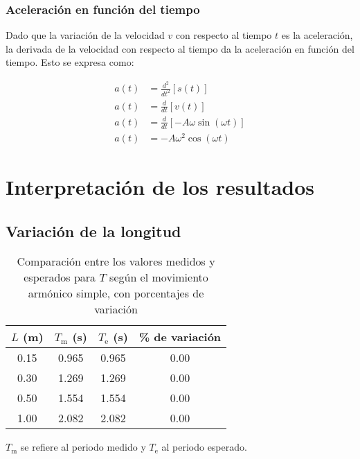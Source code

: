 \documentclass[twocolumn]{report}
\numberwithin{table}{section}
\begin{document}
\subsubsection{Aceleración en función del tiempo}

Dado que la variación de la velocidad $v$ con respecto al tiempo $t$
es la aceleración, la derivada de la velocidad con respecto al tiempo
da la aceleración en función del tiempo. Esto se expresa como:

\begin{align}
  a(t) &= \frac{d^{2}}{dt^{2}} \left[s(t)\right] \nonumber \\
  a(t) &= \frac{d}{dt} \left[v(t)\right] \nonumber \\
  a(t) &= \frac{d}{dt} \left[-A\omega\sin{(\omega t)}\right] \nonumber \\
  a(t) &= -A\omega^{2}\cos{(\omega t)}\label{eq:aceleración_tiempo}
\end{align}

\section{Interpretación de los resultados}

\subsection{Variación de la longitud}

\begin{table}
  \centering
  \begin{tabular}{cccc}
    \toprule
    $L$ (m) & $T_{\text{m}}$ (s) &
    $T_{\text{e}}$ (s) & \% de variación \\
    \midrule
    0.15 & 0.965 & 0.965 & 0.00 \\
    0.30 & 1.269 & 1.269 & 0.00 \\
    0.50 & 1.554 & 1.554 & 0.00 \\
    1.00 & 2.082 & 2.082 & 0.00 \\
    \bottomrule
  \end{tabular}

  \caption{Comparación entre los valores medidos y esperados para $T$
    según el movimiento armónico simple, con porcentajes de
  variación}\label{tab:comparación_longitud}

  \vspace{0.5em}
  \begin{minipage}{\columnwidth}
    \footnotesize
    $T_{\text{m}}$ se refiere al periodo medido y $T_{\text{e}}$ al
    periodo esperado.
  \end{minipage}
\end{table}
\end{document}
